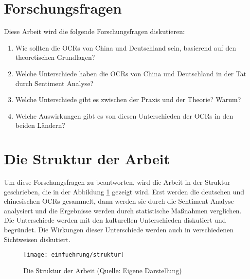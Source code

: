\section{Forschungsfragen}
Diese Arbeit wird die folgende Forschungsfragen diskutieren:
\begin{enumerate}
	\item Wie sollten die \acl{OCRs} von China und Deutschland sein, basierend auf den theoretischen Grundlagen? 
	\item Welche Unterschiede haben die \acl{OCRs} von China und Deutschland in der Tat durch Sentiment Analyse? 
	\item Welche Unterschiede gibt es zwischen der Praxis und der Theorie? Warum?
	\item Welche Auswirkungen gibt es von diesen Unterschieden der \acl{OCRs} in den beiden Ländern?
\end{enumerate}
\section{Die Struktur der Arbeit}
Um diese Forschungsfragen zu beantworten, wird die Arbeit in der Struktur geschrieben, die in der Abbildung \ref{fig:struktur} gezeigt wird. Erst werden die deutschen und chinesischen \ac{OCRs} gesammelt, dann werden sie durch die Sentiment Analyse analysiert und die Ergebnisse werden durch statistische Maßnahmen verglichen. Die Unterschiede werden mit den kulturellen Unterschieden diskutiert und begründet. Die Wirkungen dieser Unterschiede werden auch in verschiedenen Sichtweisen diskutiert.

\begin{figure}[htb]
	\centering
	\texttt{[image: einfuehrung/struktur]}
	\caption[Die Struktur der Arbeit]{Die Struktur der Arbeit (Quelle: Eigene Darstellung)}
	\label{fig:struktur}
\end{figure}

